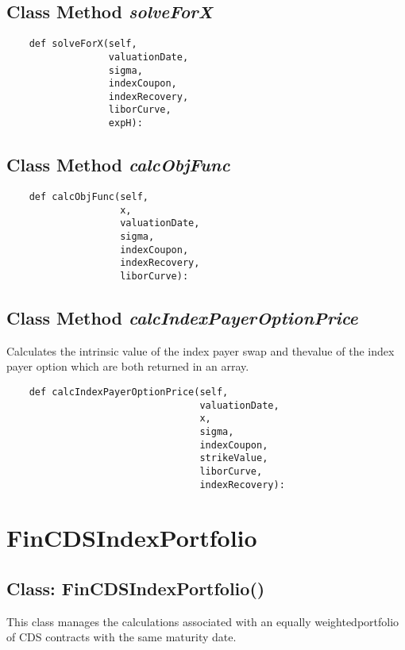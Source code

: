 \documentclass[twoside,11pt]{book}
\begin{document}
\subsection{Class Method {\it solveForX}}


\begin{lstlisting}
    def solveForX(self,
                  valuationDate,
                  sigma,
                  indexCoupon,
                  indexRecovery,
                  liborCurve,
                  expH):
\end{lstlisting}

\subsection{Class Method {\it calcObjFunc}}


\begin{lstlisting}
    def calcObjFunc(self,
                    x,
                    valuationDate,
                    sigma,
                    indexCoupon,
                    indexRecovery,
                    liborCurve):
\end{lstlisting}

\subsection{Class Method {\it calcIndexPayerOptionPrice}}
Calculates the intrinsic value of the index payer swap and thevalue of the index payer option which are both returned in an array. 

\begin{lstlisting}
    def calcIndexPayerOptionPrice(self,
                                  valuationDate,
                                  x,
                                  sigma,
                                  indexCoupon,
                                  strikeValue,
                                  liborCurve,
                                  indexRecovery):
\end{lstlisting}

\newpage
\section{FinCDSIndexPortfolio}

\subsection{Class: FinCDSIndexPortfolio()}
This class manages the calculations associated with an equally weightedportfolio of CDS contracts with the same maturity date. 
\end{document}

